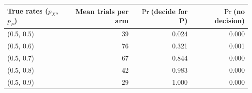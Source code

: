 \begin{tabular}{@{}lrrr@{}}
\toprule
True rates ($p_X$, $p_P$) & Mean trials per arm & $\Pr$(decide for P) & $\Pr$(no decision)\\ \midrule
(0.5, 0.5) & 39 & 0.024 & 0.000\\
(0.5, 0.6) & 76 & 0.321 & 0.001\\
(0.5, 0.7) & 67 & 0.844 & 0.000\\
(0.5, 0.8) & 42 & 0.983 & 0.000\\
(0.5, 0.9) & 29 & 1.000 & 0.000\\
\bottomrule
\end{tabular}
